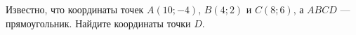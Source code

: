 \begin{ex}
	\begin{condition}
		Известно, что координаты точек \( A(10;-4) \), \( B(4;2) \) и \( C(8;6) \), а \( ABCD \) --- прямоугольник. Найдите координаты точки \( D \).
	\end{condition}
\end{ex}